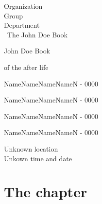 \documentclass[12pt,a4paper,oneside]{book}
\begin{document}
\begin{titlepage}

\begin{center}
\Large Organization \\
\large Group\\
Department \\

\vspace*{5cm}
\Huge \,\,\,The John Doe Book

\large John Doe Book

 of the after life
 \vspace*{4cm}
 
NameNameNameNameN - 0000

NameNameNameNameN - 0000

NameNameNameNameN - 0000

NameNameNameNameN - 0000 

 \vspace*{2.5cm}
 \nopagebreak
Unknown location\\
Unkown time and date

\end{center}

\end{titlepage}


\chapter*{The chapter}
\end{document}
